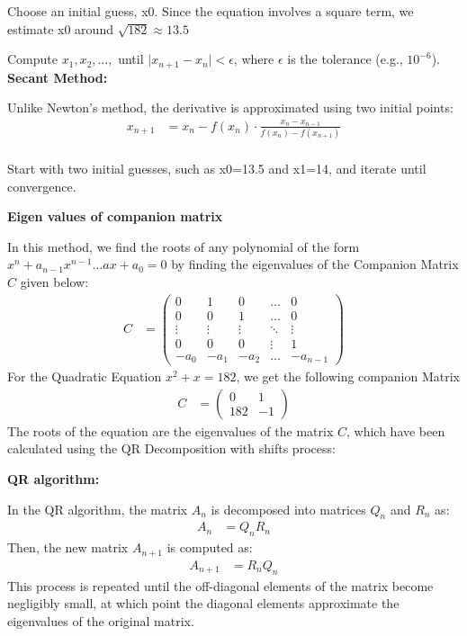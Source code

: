 \documentclass[journal]{IEEEtran}
\newcommand{\myvec}[1]{\begin{pmatrix} #1 \end{pmatrix}}
\begin{document}
Choose an initial guess, x0. Since the equation involves a square term, we estimate x0 around $\sqrt{182} \approx 13.5 $

Compute \(x_1, x_2, \dots,\) until \(\lvert x_{n+1} - x_n \rvert < \epsilon\), where \(\epsilon\) is the tolerance (e.g., \(10^{-6}\)).\\

\textbf{Secant Method:}

Unlike Newton's method, the derivative is approximated using two initial points:
\begin{align}
   x_{n+1} &= x_n - f(x_n) \cdot \frac{x_n - x_{n-1}}{f(x_n)-f(x_{n+1})}\\
\end{align}

Start with two initial guesses, such as x0=13.5 and x1=14, and iterate until convergence.

\textbf{Eigen values of companion matrix}

In this method, we find the roots of any polynomial of the form \(x^n + a_{n-1}x^{n-1}\dots ax+a_0=0\) by finding the eigenvalues of the Companion Matrix \(C\) given below:
\begin{align}
    C &= \myvec{0&1&0&\dots&0\\ 0&0&1&\dots&0\\ \vdots &\vdots &\vdots &\ddots&\vdots\\0&0&0&\vdots&1\\-a_0&-a_1&-a_2&\dots&-a_{n-1}}
\end{align}
For the Quadratic Equation \(x^2 + x = 182\), we get the following companion Matrix
\begin{align}
    C&=\myvec{0&1\\182&-1}
\end{align}
The roots of the equation are the eigenvalues of the matrix \(C\), which have been calculated using the QR Decomposition with shifts process:

\textbf{QR algorithm:}

In the QR algorithm, the matrix \(A_n\) is decomposed into matrices \(Q_n\) and \(R_n\) as:
\begin{align}
    A_{n}&=Q_nR_n
\end{align}
Then, the new matrix \(A_{n+1}\) is computed as:
\begin{align}
    A_{n+1}&=R_nQ_n
\end{align}
This process is repeated until the off-diagonal elements of the matrix become negligibly small, at which point the diagonal elements approximate the eigenvalues of the original matrix.
\end{document}
